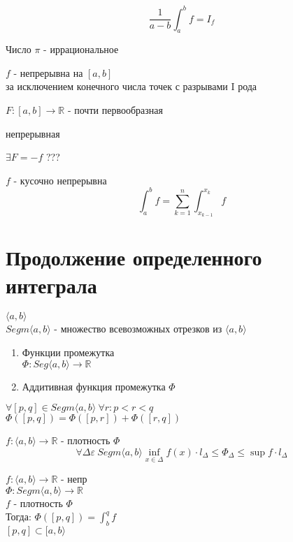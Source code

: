 \documentclass[12pt]{article}
\begin{document}
\begin{definition}
  $$\frac{1}{a-b}\int_a^bf = I_f$$
\end{definition}
\begin{theorem}
  Число $\pi$ - иррациональное
\end{theorem}
\begin{definition}
  $f$ - непрерывна на $[a,b]$ \\
  за исключением конечного числа точек с разрывами I рода
\end{definition}
\begin{definition}
  $F: [a, b] \rightarrow \mathbb{R}$ - почти первообразная
  \begin{features}
  \item непрерывная
  \item $\exists F = -f$ ???
  \end{features}
  $f$ - кусочно непрерывна \\
  $$\int_a^bf = \sum_{k=1}^n\int_{x_{k-1}}^{x_k}f$$
\end{definition}
\section{Продолжение определенного интеграла}
$\langle a, b \rangle$ \\
$Segm \langle a ,b \rangle$ - множество всевозможных отрезков из $\langle a, b \rangle$
\begin{definition}
  \hfill \break
  \begin{enumerate}
  \item Функции промежутка \\
    $\Phi: Seg \langle a, b \rangle \rightarrow \mathbb{R}$
  \item Аддитивная функция промежутка
    $\Phi$
  \end{enumerate}
  $\forall [p, q] \in Segm \langle a, b \rangle\ \forall r: p < r < q$ \\
  $\Phi([p, q]) = \Phi([p, r]) + \Phi([r, q])$
\end{definition}
\begin{definition}
  $f: \langle a, b \rangle \rightarrow \mathbb{R}$ - плотность $\Phi$ \\
  $$\forall \Delta \varepsilon\ Segm \langle a, b \rangle \inf_{x \in \Delta}f(x)\cdot l_{\Delta}\le \Phi_{\Delta} \le \sup f \cdot l_{\Delta}$$
\end{definition}
\begin{theorem}
  $f: \langle a, b \rangle \rightarrow \mathbb{R}$ - непр \\
  $\Phi: Segm \langle a, b \rangle \rightarrow \mathbb{R}$ \\
  $f$ - плотность $\Phi$ \\
  Тогда: $\Phi([p, q]) = \int_b^qf$ \\
  $[p, q] \subset [a, b \rangle$
\end{theorem}
\end{document}
